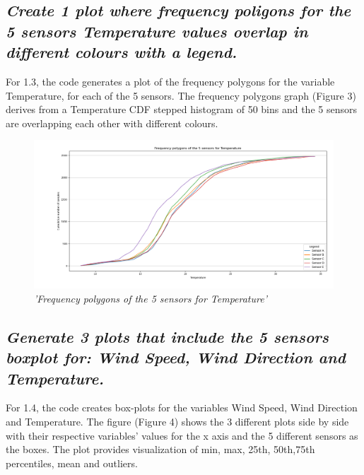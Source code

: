 \documentclass[a4paper,12pt]{article} %
\begin{document}
\subsection{\it Create 1 plot where frequency poligons for the 5 sensors Temperature values overlap in different colours with a legend.}




For 1.3, the code generates a plot of the frequency polygons for 
the variable Temperature, for each of the 5 sensors. 
The frequency polygons graph (Figure 3) derives from a Temperature CDF 
stepped histogram of 50 bins and the 5 sensors are overlapping each other with 
different colours.



\begin{figure}[H]
\centering
\includegraphics[width=\textwidth]{Graphs/Frequency_polygons_of_Temperature.png}
\caption{\it'Frequency polygons of the 5 sensors for Temperature'}
\end{figure}



\subsection{\it Generate 3 plots that include the 5 sensors boxplot for: Wind Speed, Wind Direction and Temperature.}




For 1.4, the code creates box-plots for the 
variables Wind Speed, Wind Direction and Temperature. 
The figure (Figure 4) shows the 3 different plots side by side 
with their respective variables’ values for the x axis and the 5 
different sensors as the boxes. The plot provides visualization 
of min, max, 25th, 50th,75th percentiles, mean and outliers.
\end{document}
